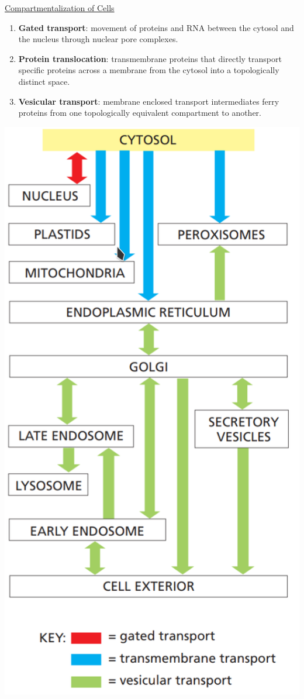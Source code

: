 \documentclass[12pt,letterpaper]{article}
\begin{document}
\begin{secbox}{\hyperlink{12}{Compartmentalization of Cells}}
{\begin{itemize}
\begin{multicols}{2}
            \begin{enumerate}
                \item \textbf{Gated transport}: movement of proteins and RNA between the cytosol and the nucleus through nuclear pore complexes.
                \item \textbf{Protein translocation}: transmembrane proteins that directly transport specific proteins across a membrane from the cytosol into a topologically distinct space.
                \item \textbf{Vesicular transport}: membrane   enclosed transport intermediates ferry proteins from one topologically equivalent compartment to another. 
            \end{enumerate}
        \begin{center}
            \includegraphics[scale=0.5]{images/fig12-5.png}

\end{center}
\end{multicols}
\end{itemize}}
\end{secbox}
\end{document}
